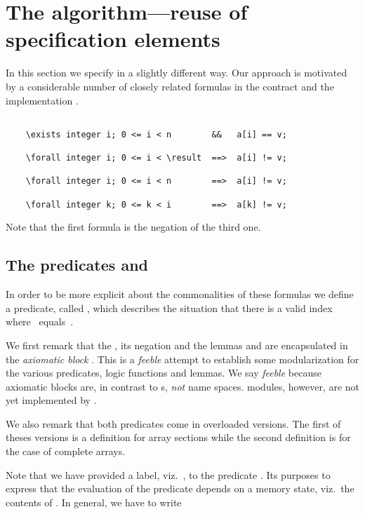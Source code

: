 
\section{The \findii algorithm---reuse of specification elements}

In this section we specify \find in a slightly different way.
Our approach is motivated by a considerable number of closely related \acsl formulas
in the contract  and the implementation .

\begin{lstlisting}[style=acsl-block]

    \exists integer i; 0 <= i < n        &&   a[i] == v;

    \forall integer i; 0 <= i < \result  ==>  a[i] != v;

    \forall integer i; 0 <= i < n        ==>  a[i] != v;

    \forall integer k; 0 <= k < i        ==>  a[k] != v;
\end{lstlisting}

Note that the first formula is the negation of the third one.

\subsection{The predicates \SomeEqual and \NoneEqual}

In order to be more explicit about the commonalities of these formulas
we define a predicate, called 
,
which describes the situation that there is a valid index  
where~ equals~.



We first remark that the \SomeEqual, its negation \NoneEqual
and the lemmas \NotSomeEqualNoneEqual and \NoneEqualNotSomeEqual are encapsulated
in the \emph{axiomatic block} 
.
This is a \emph{feeble} attempt to establish some modularization for the various predicates,
logic functions and lemmas.
We say \emph{feeble} because axiomatic blocks are, in contrast to \acsl {}s,
\emph{not} name spaces.
\acsl modules, however, are not yet implemented by \framac.

We also remark that both predicates come in overloaded versions.
The first of theses versions is a definition for array sections while the
second definition is for the case of complete arrays.

Note that we have provided a label, viz.\ , to the
predicate \SomeEqual.
Its purposes to express that the evaluation of the predicate depends on a memory state,
viz.\ the contents of .
In general, we have to write

